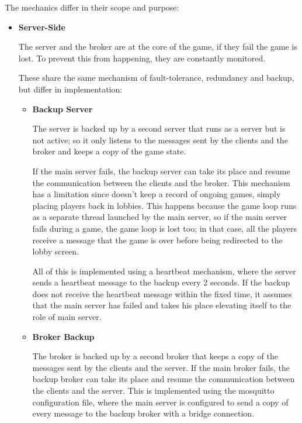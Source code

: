 \documentclass{scrartcl}
\begin{document}
The mechanics differ in their scope and purpose:
\begin{itemize}
      \item
            \textbf{Server-Side} \par
            The server and the broker are at the core of the game, if they fail the game is lost.
            To prevent this from happening, they are constantly monitored.

            These share the same mechanism of fault-tolerance, redundancy and backup,
            but differ in implementation:

            \begin{itemize}
                  \item \textbf{Backup Server} \par
                        The server is backed up by a second server that runs as a server but is
                        not active; so it only listens to the messages sent by the clients and the
                        broker and keeps a copy of the game state.

                        If the main server fails, the backup server can take its place and resume
                        the communication between the clients and the broker. This mechanism has a
                        limitation since doesn't keep a record of ongoing games, simply placing
                        players back in lobbies. This happens because the game loop runs as a separate
                        thread launched by the main server, so if the main server fails during a game,
                        the game loop is lost too; in that case, all the players receive a message
                        that the game is over before being redirected to the lobby screen.

                        All of this is implemented using a heartbeat mechanism, where the server sends a
                        heartbeat message to the backup every 2 seconds. If the backup does not
                        receive the heartbeat message within the fixed time, it assumes that
                        the main server has failed and takes his place elevating itself to the role of
                        main server.
                  \item \textbf{Broker Backup} \par
                        The broker is backed up by a second broker that keeps a copy of the messages
                        sent by the clients and the server.
                        If the main broker fails, the backup broker can take its place and resume
                        the communication between the clients and the server.
                        This is implemented using the mosquitto configuration file, where the main
                        server is configured to send a copy of every message to the backup broker
                        with a bridge connection.


\end{itemize}
\end{itemize}
\end{document}
